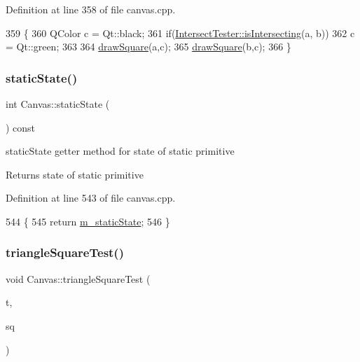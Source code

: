 Definition at line 358 of file canvas.\+cpp.


\begin{DoxyCode}
359 \{
360     QColor c = Qt::black;
361     \textcolor{keywordflow}{if}(\hyperlink{class_intersect_tester_a7710e17ff7d2e229059f23b9429213f5}{IntersectTester::isIntersecting}(a, b))
362         c = Qt::green;
363 
364     \hyperlink{class_canvas_a78ce810ea0004c4f3fa9ee9d92996875}{drawSquare}(a,c);
365     \hyperlink{class_canvas_a78ce810ea0004c4f3fa9ee9d92996875}{drawSquare}(b,c);
366 \}
\end{DoxyCode}
\mbox{\label{class_canvas_a63f657b762d08168f52630bc49efbf71}} 
\subsubsection{\texorpdfstring{static\+State()}{staticState()}}
{\footnotesize\ttfamily int Canvas\+::static\+State (\begin{DoxyParamCaption}{ }\end{DoxyParamCaption}) const}



static\+State getter method for state of static primitive 

\begin{DoxyReturn}{Returns}
state of static primitive 
\end{DoxyReturn}


Definition at line 543 of file canvas.\+cpp.


\begin{DoxyCode}
544 \{
545     \textcolor{keywordflow}{return} \hyperlink{class_canvas_adb29cf13087e13c9d4a1ef04bc53b931}{m\_staticState};
546 \}
\end{DoxyCode}
\mbox{\label{class_canvas_a8b0b8a040b3e5628a2ec2a89a3025eae}} 
\subsubsection{\texorpdfstring{triangle\+Square\+Test()}{triangleSquareTest()}}
{\footnotesize\ttfamily void Canvas\+::triangle\+Square\+Test (\begin{DoxyParamCaption}\item[{\hyperlink{class_triangle}{Triangle}}]{t,  }\item[{\hyperlink{class_a_a_b_b}{A\+A\+BB}}]{sq }\end{DoxyParamCaption})\hspace{0.3cm}{\ttfamily [private]}}



